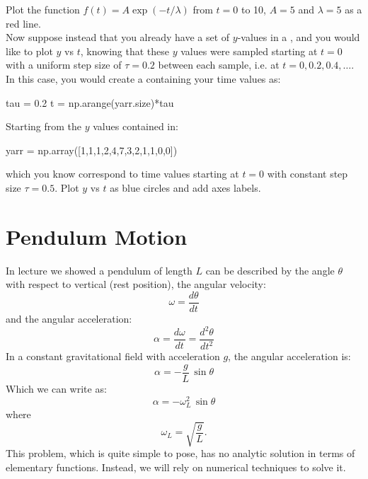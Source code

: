 \plot Plot the function $f(t) = A \exp(-t/\lambda)$ from $t=0$ to 10, $A=5$ and $\lambda=5$ as a red line. \\

Now suppose instead that you already have a set of $y$-values in a  , and you would like to plot $y$ vs $t$, knowing that these $y$ values were sampled starting at $t=0$ with a uniform step size of $\tau=0.2$ between each sample, i.e. at $t=0, 0.2, 0.4, \ldots$.  In this case, you would create a  containing your time values as:
\begin{python}
tau = 0.2
t = np.arange(yarr.size)*tau
\end{python} 
\vskip 0.25cm

\plot Starting from the $y$ values contained in:
\begin{python}
yarr = np.array([1,1,1,2,4,7,3,2,1,1,0,0])
\end{python}
which you know correspond to time values starting at $t=0$ with constant step size $\tau=0.5$.  Plot $y$ vs $t$ as blue circles and add axes labels.

\section{Pendulum Motion}

In lecture we showed a pendulum of length $L$ can be described by the angle $\theta$ with respect to vertical (rest position), the angular velocity:
\begin{displaymath}
\omega = \frac{d\theta}{dt}
\end{displaymath}
and the angular acceleration:
\begin{displaymath}
\alpha = \frac{d\omega}{dt} = \frac{d^2\theta}{dt^2} 
\end{displaymath}
In a constant gravitational field with acceleration $g$, the angular acceleration is:
\begin{displaymath}
\alpha = -\frac{g}{L} \, \sin \theta
\end{displaymath}
Which we can write as:
\begin{displaymath}
\alpha = - \omega_L^2 \, \sin \theta
\end{displaymath}
where
\begin{displaymath}
\omega_L = \sqrt{\frac{g}{L}}.
\end{displaymath}
This problem, which is quite simple to pose, has no analytic solution
in terms of elementary functions.  Instead, we will rely on numerical
techniques to solve it.\\

